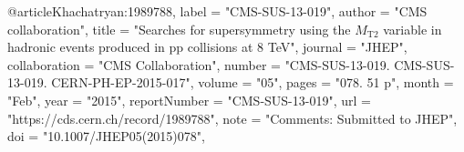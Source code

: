 @article{Khachatryan:1989788,
      label          = "CMS-SUS-13-019",
      author        = "{CMS collaboration}",
      title         = "{Searches for supersymmetry using the $M_\mathrm{T2}$
                       variable in hadronic events produced in pp collisions at 8
                       TeV}",
      journal       = "JHEP",
      collaboration = "CMS Collaboration",
      number        = "CMS-SUS-13-019. CMS-SUS-13-019. CERN-PH-EP-2015-017",
      volume        = "05",
      pages         = "078. 51 p",
      month         = "Feb",
      year          = "2015",
      reportNumber  = "CMS-SUS-13-019",
      url           = "https://cds.cern.ch/record/1989788",
      note          = "Comments: Submitted to JHEP",
      doi           = "10.1007/JHEP05(2015)078",
}

